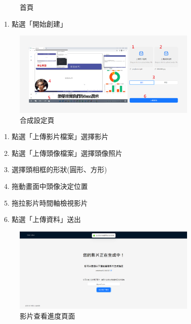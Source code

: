 \documentclass[12pt]{article}
\begin{document}
\begin{enumerate}
\begin{figure}[H]
      \caption{首頁}
      \label{s0}
    \end{figure}
    \begin{enumerate}[label=\arabic*.]
      \item 點選「開始創建」
    \end{enumerate}
    \begin{figure}[H]
      \centering
        \includegraphics[width=0.8\textwidth]{./s1.png}
      \caption{合成設定頁}
      \label{s1}
    \end{figure}
    \begin{enumerate}[label=\arabic*.]
      \item 點選「上傳影片檔案」選擇影片
      \item 點選「上傳頭像檔案」選擇頭像照片
      \item 選擇頭相框的形狀(圓形、方形)
      \item 拖動畫面中頭像決定位置
      \item 拖拉影片時間軸檢視影片
      \item 點選「上傳資料」送出   
    \end{enumerate}
    \begin{figure}[H]
      \centering
        \includegraphics[width=0.8\textwidth]{./s2.png}
      \caption{影片查看進度頁面}
      \label{s2}
    \end{figure}

\end{enumerate}
\end{document}
